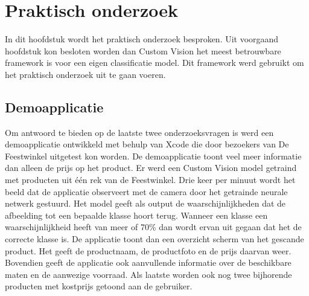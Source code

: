 \chapter{Praktisch onderzoek}
\label{ch:Praktisch onderzoek}

In dit hoofdstuk wordt het praktisch onderzoek besproken. Uit voorgaand hoofdstuk kon besloten worden dan Custom Vision het meest betrouwbare framework is voor een eigen classificatie model. 
Dit framework werd gebruikt om het praktisch onderzoek uit te gaan voeren. 

\section{Demoapplicatie}
\label{sec:Demoapplicatie}

Om antwoord te bieden op de laatste twee onderzoeksvragen is werd een demoapplicatie ontwikkeld met behulp van Xcode die door bezoekers van De Feestwinkel uitgetest kon worden. De demoapplicatie toont veel meer informatie dan alleen de prijs op het product. Er werd een Custom Vision model getraind met producten uit één rek van de Feestwinkel. Drie keer per minuut wordt het beeld dat de applicatie observeert met de camera door het getrainde neurale netwerk gestuurd. Het model geeft als output de waarschijnlijkheden dat de afbeelding tot een bepaalde klasse hoort terug. Wanneer een klasse een waarschijnlijkheid heeft van meer of 70\% dan wordt ervan uit gegaan dat het de correcte klasse is. De applicatie toont dan een overzicht scherm van het gescande product. Het geeft de productnaam, de productfoto en de prijs daarvan weer. Bovendien geeft de applicatie ook aanvullende informatie over de beschikbare maten en de aanwezige voorraad. Als laatste worden ook nog twee bijhorende producten met kostprijs getoond aan de gebruiker.

